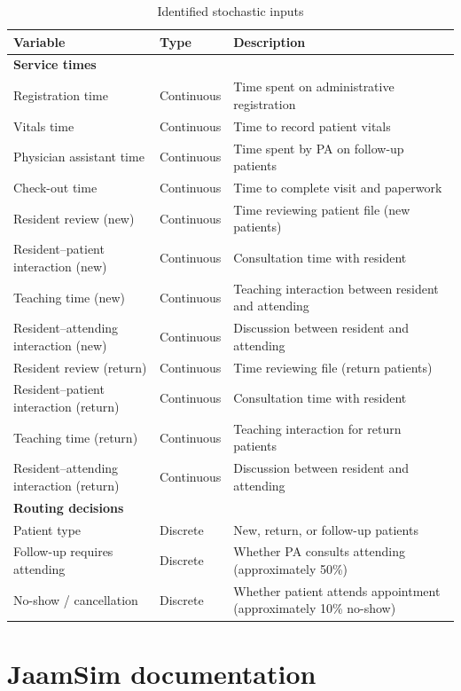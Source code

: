 \begin{table}[H]
\centering
\small
\begin{tabularx}{\textwidth}{p{4cm} p{2cm} X}
\toprule
\textbf{Variable} & \textbf{Type} & \textbf{Description} \\
\midrule

\multicolumn{3}{l}{\textbf{Service times}} \\
Registration time & Continuous & Time spent on administrative registration \\
Vitals time & Continuous & Time to record patient vitals \\
Physician assistant time & Continuous & Time spent by PA on follow-up patients \\
Check-out time & Continuous & Time to complete visit and paperwork \\
Resident review (new) & Continuous & Time reviewing patient file (new patients) \\
Resident--patient interaction (new) & Continuous & Consultation time with resident \\
Teaching time (new) & Continuous & Teaching interaction between resident and attending \\
Resident--attending interaction (new) & Continuous & Discussion between resident and attending \\
Resident review (return) & Continuous & Time reviewing file (return patients) \\
Resident--patient interaction (return) & Continuous & Consultation time with resident \\
Teaching time (return) & Continuous & Teaching interaction for return patients \\
Resident--attending interaction (return) & Continuous & Discussion between resident and attending \\

\midrule
\multicolumn{3}{l}{\textbf{Routing decisions}} \\
Patient type & Discrete & New, return, or follow-up patients \\
Follow-up requires attending & Discrete & Whether PA consults attending (approximately 50\%) \\
No-show / cancellation & Discrete & Whether patient attends appointment (approximately 10\% no-show) \\

\bottomrule
\end{tabularx}
\caption{Identified stochastic inputs}
\label{tab:stochastic_vars}
\end{table}

\newpage
\section{JaamSim documentation}


